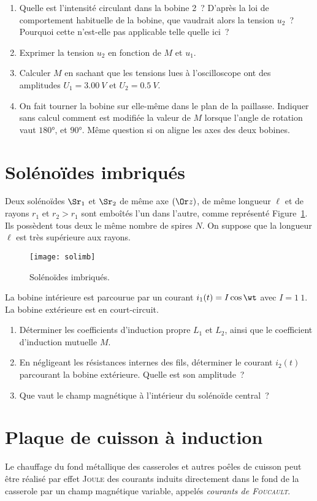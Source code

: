 \documentclass[a4paper, 10pt, final, garamond]{book}
\begin{document}
\begin{enumerate}
  \item Quelle est l'intensité circulant dans la bobine 2~? D'après la loi de
    comportement habituelle de la bobine, que vaudrait alors la tension $u_2$~?
    Pourquoi cette n'est-elle pas applicable telle quelle ici~?
  \item Exprimer la tension $u_2$ en fonction de $M$ et $u_1$.
  \item Calculer $M$ en sachant que les tensions lues à l'oscilloscope ont des
    amplitudes $U_1 = \SI{3.00}{V}$ et $U_2 = \SI{0.5}{V}$.
  \item On fait tourner la bobine sur elle-même dans le plan de la paillasse.
    Indiquer sans calcul comment est modifiée la valeur de $M$ lorsque l'angle
    de rotation vaut $\ang{180}$, et $\ang{90}$. Même question si on aligne les
    axes des deux bobines.
\end{enumerate}

\section{Solénoïdes imbriqués}
\label{sec:solimb}
Deux solénoïdes $\Sr_1$ et $\Sr_2$ de même axe $(\Or z)$, de même longueur $\ell
$ et de rayons $r_1$ et $r_2 > r_1$ sont emboîtés l'un dans l'autre, comme
représenté Figure~\ref{fig:solimb}. Ils possèdent tous deux le même nombre de
spires $N$. On suppose que la longueur $\ell $ est très supérieure aux rayons.
\begin{figure}[h]
  \centering
  \texttt{[image: solimb]}
  \caption{Solénoïdes imbriqués.}
  \label{fig:solimb}
\end{figure}
La bobine intérieure est parcourue par un courant $i_1(t) = I \cos{\wt}$ avec $I
= \SI{1}{1}$. La bobine extérieure est en court-circuit.
\begin{enumerate}
  \item Déterminer les coefficients d'induction propre $L_1$ et $L_2$, ainsi que
    le coefficient d'induction mutuelle $M$.
  \item En négligeant les résistances internes des fils, déterminer le courant
    $i_2(t)$ parcourant la bobine extérieure. Quelle est son amplitude~?
  \item Que vaut le champ magnétique à l'intérieur du solénoïde central~?
\end{enumerate}

\section{Plaque de cuisson à induction}
\label{sec:plqind}
Le chauffage du fond métallique des casseroles et autres poêles de cuisson peut
être réalisé par effet \textsc{Joule} des courants induits directement dans le
fond de la casserole par un champ magnétique variable, appelés \textit{courants
de \textsc{Foucault}}.
\end{document}
